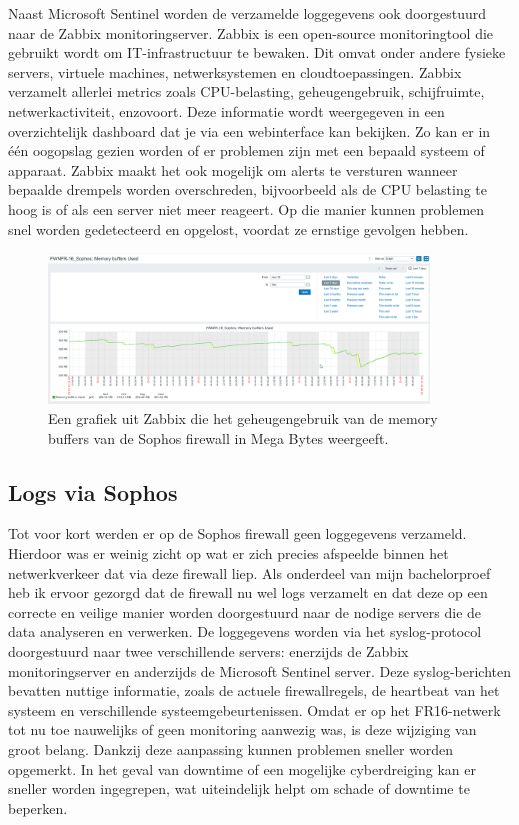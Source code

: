 Naast Microsoft Sentinel worden de verzamelde loggegevens ook doorgestuurd naar de Zabbix monitoringserver. Zabbix is een open-source monitoringtool die gebruikt wordt om IT-infrastructuur te bewaken. Dit omvat onder andere fysieke servers, virtuele machines, netwerksystemen en cloudtoepassingen.
Zabbix verzamelt allerlei metrics zoals CPU-belasting, geheugengebruik, schijfruimte, netwerkactiviteit, enzovoort. Deze informatie wordt weergegeven in een overzichtelijk dashboard dat je via een webinterface kan bekijken. Zo kan er in één oogopslag gezien worden of er problemen zijn met een bepaald systeem of apparaat.
Zabbix maakt het ook mogelijk om alerts te versturen wanneer bepaalde drempels worden overschreden, bijvoorbeeld als de CPU belasting te hoog is of als een server niet meer reageert. Op die manier kunnen problemen snel worden gedetecteerd en opgelost, voordat ze ernstige gevolgen hebben.

\begin{figure}[H]
    \centering
    \includegraphics[width=0.9\textwidth]{fotos/SophosZabbix.png}
    \caption[Sophos Memory Buffer in Zabbix]{\label{fig:grail}Een grafiek uit Zabbix die het geheugengebruik van de memory buffers van de Sophos firewall in Mega Bytes weergeeft.}
\end{figure} 


\subsection{Logs via Sophos}
Tot voor kort werden er op de Sophos firewall geen loggegevens verzameld. Hierdoor was er weinig zicht op wat er zich precies afspeelde binnen het netwerkverkeer dat via deze firewall liep. Als onderdeel van mijn bachelorproef heb ik ervoor gezorgd dat de firewall nu wel logs verzamelt en dat deze op een correcte en veilige manier worden doorgestuurd naar de nodige servers die de data analyseren en verwerken.
De loggegevens worden via het syslog-protocol doorgestuurd naar twee verschillende servers: enerzijds de Zabbix monitoringserver en anderzijds de Microsoft Sentinel server. Deze syslog-berichten bevatten nuttige informatie, zoals de actuele firewallregels, de heartbeat van het systeem en verschillende systeemgebeurtenissen.
Omdat er op het FR16-netwerk tot nu toe nauwelijks of geen monitoring aanwezig was, is deze wijziging van groot belang. Dankzij deze aanpassing kunnen problemen sneller worden opgemerkt. In het geval van downtime of een mogelijke cyberdreiging kan er sneller worden ingegrepen, wat uiteindelijk helpt om schade of downtime te beperken.



